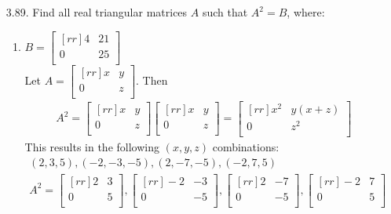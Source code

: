 \documentclass[12pt]{article}
\begin{document}
\begin{enumerate}
\item [3.89.] Find all real triangular matrices $A$ such that $A^2=B$, where:
	\begin{enumerate}
	\item $B= \begin{bmatrix}[rr] 4 & 21\\ 0 & 25\\ \end{bmatrix}$\\
	Let $A= \begin{bmatrix}[rr] x & y\\ 0 & z\\ \end{bmatrix}$. Then 
	\begin{align*}
	A^2 =
	\begin{bmatrix}[rr] x & y\\ 0 & z\\ \end{bmatrix}
	\begin{bmatrix}[rr] x & y\\ 0 & z\\ \end{bmatrix}
	=
	\begin{bmatrix}[rr] 
	x^2 & y(x+z)\\
	0 & z^2\\
	\end{bmatrix}
	\end{align*}
	This results in the following $(x,y,z)$ combinations:
	\begin{align*}
	(2,3,5),(-2,-3,-5),(2,-7,-5),(-2,7,5)\\
	A^2 =
	\begin{bmatrix}[rr] 2 & 3\\ 0 & 5\\ \end{bmatrix},
	\begin{bmatrix}[rr] -2 & -3\\ 0 & -5\\ \end{bmatrix},
	\begin{bmatrix}[rr] 2 & -7\\ 0 & -5\\ \end{bmatrix},
	\begin{bmatrix}[rr] -2 & 7\\ 0 & 5\\ \end{bmatrix}
	\end{align*}
	\end{enumerate}



\end{enumerate}
\end{document}
